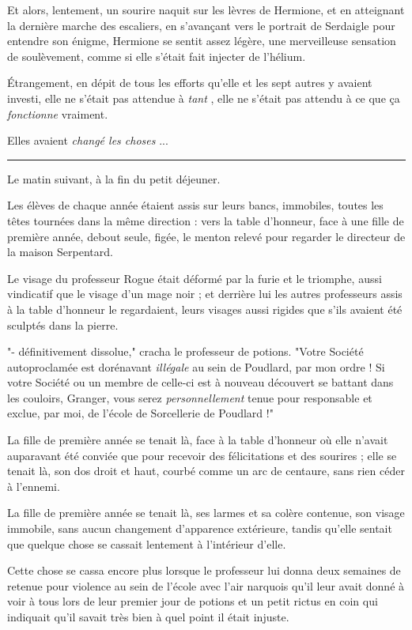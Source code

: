 Et alors, lentement, un sourire naquit sur les lèvres de Hermione, et en atteignant la dernière marche des escaliers, en s'avançant vers le portrait de Serdaigle pour entendre son énigme, Hermione se sentit assez légère, une merveilleuse sensation de soulèvement, comme si elle s'était fait injecter de l'hélium.

Étrangement, en dépit de tous les efforts qu'elle et les sept autres y avaient investi, elle ne s'était pas attendue à \emph{tant} , elle ne s'était pas attendu à ce que ça \emph{fonctionne}  vraiment.

Elles avaient \emph{changé les choses} ...
\par\noindent\rule{\textwidth}{0.4pt}
Le matin suivant, à la fin du petit déjeuner.

Les élèves de chaque année étaient assis sur leurs bancs, immobiles, toutes les têtes tournées dans la même direction : vers la table d'honneur, face à une fille de première année, debout seule, figée, le menton relevé pour regarder le directeur de la maison Serpentard.

Le visage du professeur Rogue était déformé par la furie et le triomphe, aussi vindicatif que le visage d'un mage noir ; et derrière lui les autres professeurs assis à la table d'honneur le regardaient, leurs visages aussi rigides que s'ils avaient été sculptés dans la pierre.

"- définitivement dissolue," cracha le professeur de potions. "Votre Société autoproclamée est dorénavant \emph{illégale}  au sein de Poudlard, par mon ordre ! Si votre Société ou un membre de celle-ci est à nouveau découvert se battant dans les couloirs, Granger, vous serez \emph{personnellement}  tenue pour responsable et exclue, par moi, de l'école de Sorcellerie de Poudlard !"

La fille de première année se tenait là, face à la table d'honneur où elle n'avait auparavant été conviée que pour recevoir des félicitations et des sourires ; elle se tenait là, son dos droit et haut, courbé comme un arc de centaure, sans rien céder à l'ennemi.

La fille de première année se tenait là, ses larmes et sa colère contenue, son visage immobile, sans aucun changement d'apparence extérieure, tandis qu'elle sentait que quelque chose se cassait lentement à l'intérieur d'elle.

Cette chose se cassa encore plus lorsque le professeur lui donna deux semaines de retenue pour violence au sein de l'école avec l'air narquois qu'il leur avait donné à voir à tous lors de leur premier jour de potions et un petit rictus en coin qui indiquait qu'il savait très bien à quel point il était injuste.

